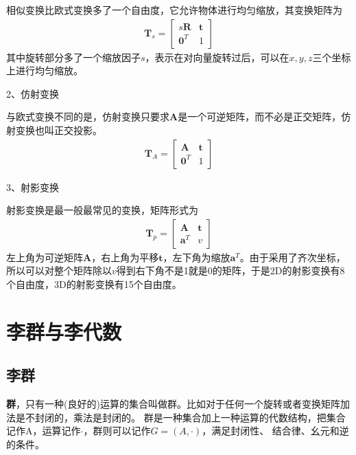 \documentclass[10pt]{article}
\begin{document}
相似变换比欧式变换多了一个自由度，它允许物体进行均匀缩放，其变换矩阵为
\begin{align}
    \mathbf{T}_{s}=\left[\begin{array}{ll}
        s\mathbf{R} & \mathbf{t} \\
        \mathbf{0}^{T} & 1 \end{array}
        \right]
    \end{align}
其中旋转部分多了一个缩放因子$s$，表示在对向量旋转过后，可以在$x,y,z$三个坐标上进行均匀缩放。

2、仿射变换

与欧式变换不同的是，仿射变换只要求$\mathbf{A}$是一个可逆矩阵，而不必是正交矩阵，仿射变换也叫正交投影。
\begin{align}  
    \mathbf{T}_A=\left[\begin{array}{ll}
        \mathbf{A} & \mathbf{t} \\
        \mathbf{0}^{T} & 1
    \end{array}\right]
\end{align}
    
3、射影变换

射影变换是最一般最常见的变换，矩阵形式为
\begin{align}  
    \mathbf{T}_p=\left[\begin{array}{ll}
        \mathbf{A} & \mathbf{t} \\
        \mathbf{a}^{T} & v
    \end{array}\right]
\end{align}
左上角为可逆矩阵$\mathbf{A}$，右上角为平移$\mathbf{t}$，左下角为缩放$\mathbf{a}^{T}$。由于采用了齐次坐标，
所以可以对整个矩阵除以$v$得到右下角不是1就是0的矩阵，于是2D的射影变换有8个自由度，3D的射影变换有15个自由度。
\section{李群与李代数}
\subsection{李群}
\textbf{群}，只有一种(良好的)运算的集合叫做群。比如对于任何一个旋转或者变换矩阵加法是不封闭的，乘法是封闭的。
群是一种集合加上一种运算的代数结构，把集合记作A，运算记作$\cdot$，群则可以记作$G=(A,\cdot)$，满足封闭性、
结合律、幺元和逆的条件。
\end{document}
